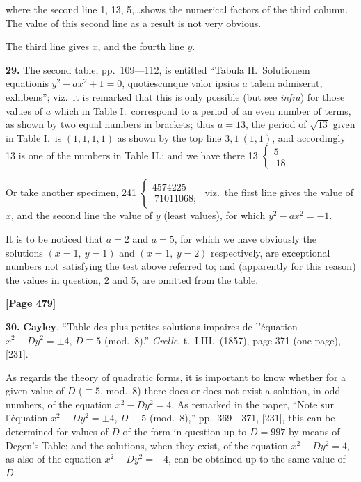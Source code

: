 \documentclass[11pt,a4paper]{article}
\begin{document}
where the second line 1, 13, 5,\ldots shows the numerical factors of the third column.
The value of this second line as a result is not very obvious.

The third line gives $x$, and the fourth line $y$.

\textbf{29.} The second table, pp.\ 109---112, is entitled ``Tabula II.\ Solutionem equationis
$y^{2} - ax^{2} + 1 = 0$, quotiescunque valor ipsius $a$ talem admiserat, exhibens'';
viz.\ it is remarked that this is only possible (but see \textit{infra}) for those values of $a$ which in
Table I.\ correspond to a period of an even number of terms, as shown by two
equal numbers in brackets; thus $a = 13$, the period of $\sqrt{13}$ given in Table I.\ is
$(1, 1, 1, 1)$ as shown by the top line $3, 1\ (1, 1)$, and accordingly 13 is one of
the numbers in Table II.; and we have there 13 $\begin{cases} 5 \\\ 18. \end{cases}$

Or take another specimen, 241 $\begin{cases} 4574225 \\\ 71011068; \end{cases}$
viz.\ the first line gives the value of $x$, and the second line the value of $y$ (least values),
for which $y^{2} - ax^{2} = -1$.

It is to be noticed that $a = 2$ and $a = 5$, for which we have obviously the
solutions $(x = 1,\ y = 1)$ and $(x = 1,\ y = 2)$ respectively, are exceptional numbers not
satisfying the test above referred to; and (apparently for this reason) the values in
question, 2 and 5, are omitted from the table.

\newpage
\textbf{[Page 479]}

\textbf{30.} \textbf{Cayley}, ``Table des plus petites solutions impaires de l'\' equation $x^{2} - Dy^{2} = \pm 4$,
$D \equiv 5$ (mod.\ 8).'' \textit{Crelle}, t.\ LIII.\ (1857), page 371 (one page), [231].

As regards the theory of quadratic forms, it is important to know whether for
a given value of $D$ ($\equiv 5$, mod.\ 8) there does or does not exist a solution, in odd
numbers, of the equation $x^{2} - Dy^{2} = 4$. As remarked in the paper, ``Note sur l'\' equation
$x^{2} - Dy^{2} = \pm 4$, $D \equiv 5$ (mod.\ 8),'' pp.\ 369---371, [231], this can be determined for values
of $D$ of the form in question up to $D = 997$ by means of Degen's Table; and the
solutions, when they exist, of the equation $x^{2} - Dy^{2} = 4$, as also of the equation
$x^{2} - Dy^{2} = -4$, can be obtained up to the same value of $D$.
\end{document}

